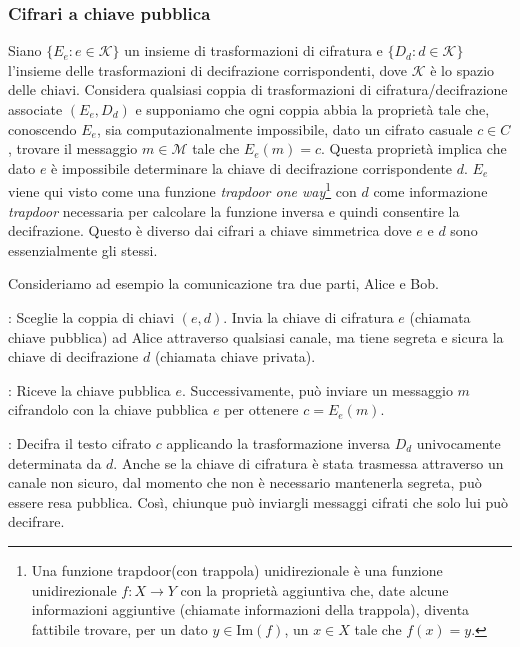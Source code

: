 \documentclass{article}
\theoremstyle{definition}
\begin{document}
\subsubsection{Cifrari a chiave pubblica}
Siano \( \{ E_e : e \in   \mathcal{K} \} \) un insieme di trasformazioni di cifratura e \( \{ D_d : d \in \mathcal{K} \} \) l'insieme delle trasformazioni di decifrazione corrispondenti, dove  \( \mathcal{K} \) è lo spazio delle chiavi. Considera qualsiasi coppia di trasformazioni di cifratura/decifrazione associate \( (E_e, D_d) \) e supponiamo che ogni coppia abbia la proprietà tale che, conoscendo \( E_e \), sia computazionalmente impossibile, dato un cifrato casuale \( c \in C \), trovare il messaggio \( m \in  \mathcal{M} \) tale che \( E_e(m) = c \). Questa proprietà implica che dato \( e \) è impossibile determinare la chiave di decifrazione corrispondente \( d \). \( E_e \) viene qui visto come una funzione \textit{trapdoor one way}\footnote{Una funzione trapdoor(con trappola) unidirezionale  è una funzione unidirezionale \( f : X \rightarrow Y \) con la proprietà aggiuntiva che, date alcune informazioni aggiuntive (chiamate informazioni della trappola), diventa fattibile trovare, per un dato \( y \in \text{Im}(f) \), un \( x \in X \) tale che \( f(x) = y \).
} con \( d \) come informazione \textit{trapdoor} necessaria per calcolare la funzione inversa e quindi consentire la decifrazione. Questo è diverso dai cifrari a chiave simmetrica dove \( e \) e \( d \) sono essenzialmente gli stessi.

Consideriamo ad esempio la comunicazione tra due parti, Alice e Bob. 

\begin{customitemize}
    \item : Sceglie la coppia di chiavi $(e, d)$. Invia la chiave di cifratura $e$ (chiamata chiave pubblica) ad Alice attraverso qualsiasi canale, ma tiene segreta e sicura la chiave di decifrazione $d$ (chiamata chiave privata).
    
    \item : Riceve la chiave pubblica $e$. Successivamente, può inviare un messaggio $m$ cifrandolo con la chiave pubblica $e$ per ottenere $c = E_e(m)$.
    
    \item : Decifra il testo cifrato $c$ applicando la trasformazione inversa $D_d$ univocamente determinata da $d$. Anche se la chiave di cifratura è stata trasmessa attraverso un canale non sicuro, dal momento che non è necessario mantenerla segreta, può essere resa pubblica. Così, chiunque può inviargli messaggi cifrati che solo lui può decifrare.
\end{customitemize}
\end{document}
